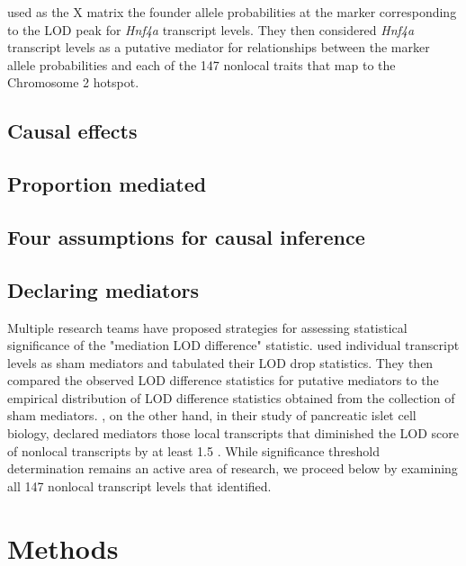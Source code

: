 \documentclass{article}
\begin{document}
\citet{keller2018genetic} used as the X matrix the founder allele probabilities at the marker corresponding to the LOD peak for \emph{Hnf4a} transcript levels. They then considered \emph{Hnf4a} transcript levels as a putative mediator for relationships between the marker allele probabilities and each of the 147 nonlocal traits that map to the Chromosome 2 hotspot.




\subsection{Causal effects}


\subsection{Proportion mediated}



\subsection{Four assumptions for causal inference}




\subsection{Declaring mediators}

Multiple research teams have proposed strategies for assessing statistical significance of the "mediation LOD difference" statistic. \citet{chick2016defining} used individual transcript levels as sham mediators and tabulated their LOD drop statistics. They then compared the observed LOD difference statistics for putative mediators to the empirical distribution of LOD difference  statistics obtained from the collection of sham mediators. \citet{keller2018genetic}, on the other hand, in their study of pancreatic islet cell biology, declared mediators those local transcripts that diminished the LOD score of nonlocal transcripts by at least 1.5 \citep{keller2018genetic}. While significance threshold determination remains an active area of research, we proceed below by examining all 147 nonlocal transcript levels that \citet{keller2018genetic} identified.
 


\section{Methods}
\end{document}
